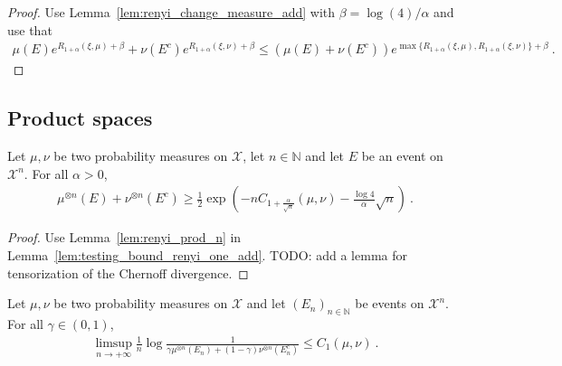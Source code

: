 \begin{proof}%
{}
Use Lemma~\ref{lem:renyi_change_measure_add} with $\beta = \log(4)/\alpha$ and use that
\begin{align*}
\mu(E) e^{R_{1+\alpha}(\xi, \mu) + \beta} + \nu(E^c) e^{R_{1+\alpha}(\xi, \nu) + \beta}
\le (\mu(E) + \nu(E^c)) e^{\max \{R_{1+\alpha}(\xi, \mu), R_{1+\alpha}(\xi, \nu)\} + \beta}
\: .
\end{align*}

\end{proof}



\subsection{Product spaces}

\begin{lemma}
  \label{lem:testing_bound_renyi_one_add_n}
  Let $\mu, \nu$ be two probability measures on $\mathcal X$, let $n \in \mathbb{N}$ and let $E$ be an event on $\mathcal X^n$. For all $\alpha > 0$,
  \begin{align*}
  \mu^{\otimes n}(E) + \nu^{\otimes n}(E^c) \ge \frac{1}{2}\exp\left( - n C_{1+\frac{\alpha}{\sqrt{n}}}(\mu, \nu) - \frac{\log 4}{\alpha}\sqrt{n}\right) \: .
  \end{align*}
\end{lemma}

\begin{proof}
Use Lemma~\ref{lem:renyi_prod_n} in Lemma~\ref{lem:testing_bound_renyi_one_add}. TODO: add a lemma for tensorization of the Chernoff divergence.
\end{proof}

\begin{theorem}
  \label{thm:testing_bound_chernoff}
  Let $\mu, \nu$ be two probability measures on $\mathcal X$ and let $(E_n)_{n \in \mathbb{N}}$ be events on $\mathcal X^n$. For all $\gamma \in (0,1)$,
  \begin{align*}
  \limsup_{n \to +\infty} \frac{1}{n}\log \frac{1}{\gamma \mu^{\otimes n}(E_n) + (1 - \gamma)\nu^{\otimes n}(E_n^c)}
  \le C_1(\mu, \nu)
  \: .
  \end{align*}
\end{theorem}

